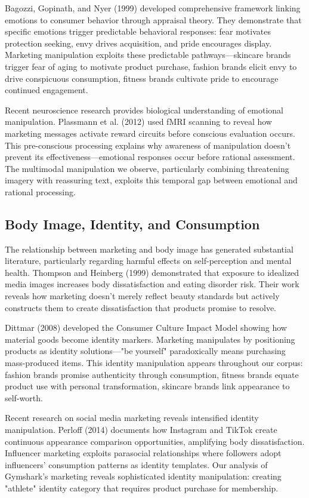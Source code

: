 Bagozzi, Gopinath, and Nyer (1999) developed comprehensive framework linking emotions to consumer behavior through appraisal theory. They demonstrate that specific emotions trigger predictable behavioral responses: fear motivates protection seeking, envy drives acquisition, and pride encourages display. Marketing manipulation exploits these predictable pathways—skincare brands trigger fear of aging to motivate product purchase, fashion brands elicit envy to drive conspicuous consumption, fitness brands cultivate pride to encourage continued engagement.

Recent neuroscience research provides biological understanding of emotional manipulation. Plassmann et al. (2012) used fMRI scanning to reveal how marketing messages activate reward circuits before conscious evaluation occurs. This pre-conscious processing explains why awareness of manipulation doesn't prevent its effectiveness—emotional responses occur before rational assessment. The multimodal manipulation we observe, particularly combining threatening imagery with reassuring text, exploits this temporal gap between emotional and rational processing.

\subsection{Body Image, Identity, and Consumption}

The relationship between marketing and body image has generated substantial literature, particularly regarding harmful effects on self-perception and mental health. Thompson and Heinberg (1999) demonstrated that exposure to idealized media images increases body dissatisfaction and eating disorder risk. Their work reveals how marketing doesn't merely reflect beauty standards but actively constructs them to create dissatisfaction that products promise to resolve.

Dittmar (2008) developed the Consumer Culture Impact Model showing how material goods become identity markers. Marketing manipulates by positioning products as identity solutions—"be yourself" paradoxically means purchasing mass-produced items. This identity manipulation appears throughout our corpus: fashion brands promise authenticity through consumption, fitness brands equate product use with personal transformation, skincare brands link appearance to self-worth.

Recent research on social media marketing reveals intensified identity manipulation. Perloff (2014) documents how Instagram and TikTok create continuous appearance comparison opportunities, amplifying body dissatisfaction. Influencer marketing exploits parasocial relationships where followers adopt influencers' consumption patterns as identity templates. Our analysis of Gymshark's marketing reveals sophisticated identity manipulation: creating "athlete" identity category that requires product purchase for membership.

